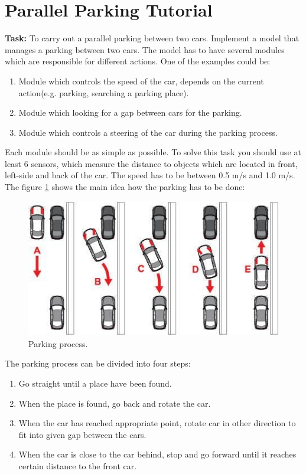 \section{Parallel Parking Tutorial}
\textbf{Task:} To carry out a parallel parking between two cars. \newline
Implement a model that manages a parking between two cars. The model has to have several modules which are responsible for different actions. One of the examples could be:
\begin{enumerate}
    \item Module which controls the speed of the car, depends on the current action(e.g. parking, searching a parking place).
    \item Module which looking for a gap between cars for the parking.
    \item Module which controls a steering of the car during the parking process.
\end{enumerate}
Each module should be as simple as possible. \newline
To solve this task you should use at least 6 sensors, which measure the distance to objects which are located in front, left-side and back of the car. The speed has to be between 0.5 m/s and 1.0 m/s. The figure \ref{fig:parking} shows the main idea how the parking has to be done:
\begin{figure}[h!]
    \centering
    \includegraphics[width=0.8\linewidth]{src/pic/parking_process1}
    \caption{Parking process.}
    \label{fig:parking}
\end{figure} \newline
The parking process can be divided into four steps:
\begin{enumerate}
    \item Go straight until a place have been found.
    \item When the place is found, go back and rotate the car.
    \item When the car has reached appropriate point, rotate car in other direction to fit into given gap between the cars.
    \item When the car is close to the car behind, stop and go forward until it reaches certain distance to the front car.
\end{enumerate}
